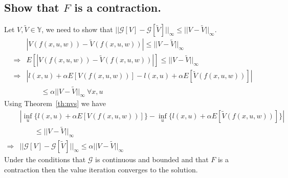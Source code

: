 \subsection{Show that $F$ is a contraction.}
\label{sec:showfcontraction}
Let $V,\tilde{V}\in\mathbb{Y}$, we need to show that $||\mathcal{G}[V]-\mathcal{G}[\tilde{V}]||_\infty \leq ||V-\tilde{V}||_\infty$.
\begin{align*}
&|V(f(x,u,w)) - \tilde{V}(f(x,u,w))| \leq ||V-\tilde{V}||_\infty \\
\Rightarrow &E[|V(f(x,u,w)) - \tilde{V}(f(x,u,w))|] \leq ||V-\tilde{V}||_\infty \\
\Rightarrow &|l(x,u)+\alpha E[V(f(x,u,w))] - l(x,u)+\alpha E[\tilde{V}(f(x,u,w))]| \\
&\qquad \leq \alpha||V-\tilde{V}||_\infty~\forall x,u
\end{align*}
Using Theorem~\ref{th:nvs} we have
\begin{align*}
&|\inf_u\{l(x,u)+\alpha E[V(f(x,u,w))]\} - \inf_u\{l(x,u)+\alpha E[\tilde{V}(f(x,u,w))]\}| \\
&\qquad \leq ||V-\tilde{V}||_\infty \\
\Rightarrow &||\mathcal{G}[V]-\mathcal{G}[\tilde{V}]||_\infty \leq \alpha||V-\tilde{V}||_\infty
\end{align*}
Under the conditions that $\mathcal{G}$ is continuous and bounded and that $F$ is a contraction then the value iteration converges to the solution.

